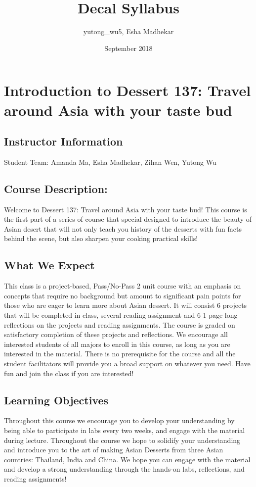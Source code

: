 \documentclass{article}
\title{Decal Syllabus}
\author{yutong_wu5, Esha Madhekar}
\date{September 2018}
\begin{document}
\maketitle


\section{Introduction to Dessert 137: Travel around Asia with your taste bud}



\subsection{Instructor Information}
Student Team: Amanda Ma, Esha Madhekar, Zihan Wen, Yutong Wu



\subsection{Course Description:}
Welcome to Dessert 137: Travel around Asia with your taste bud! This course is the first part of a series of course that special designed to introduce the beauty of Asian desert that will not only teach you history of the desserts with fun facts behind the scene, but also sharpen your cooking practical skills!

\subsection{What We Expect}
This class is a project-based, Pass/No-Pass 2 unit course with an emphasis on concepts that require no background but amount to significant pain points for those who are eager to learn more about Asian dessert. It will consist 6 projects that will be completed in class, several reading assignment and 6 1-page long reflections on the projects and reading assignments. The course is graded on satisfactory completion of these projects and reflections.
We encourage all interested students of all majors to enroll in this course, as long as you are interested in the material. There is no prerequisite for the course and all the student facilitators will provide you a broad support on whatever you need. Have fun and join the class if you are interested!


\subsection{Learning Objectives}
Throughout this course we encourage you to develop your understanding by being able to participate in labs every two weeks, and engage with the material during lecture. Throughout the course we hope to solidify your understanding and introduce you to the art of making Asian Desserts from three Asian countries: Thailand, India and China. We hope you can engage with the material and develop a strong understanding through the hands-on labs, reflections, and reading assignments!
\end{document}
